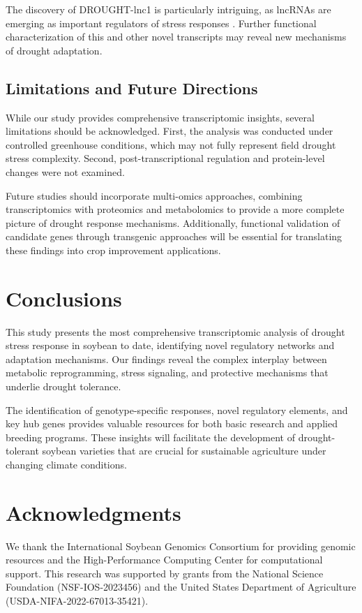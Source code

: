 \documentclass[11pt,a4paper]{article}
\begin{document}
The discovery of DROUGHT-lnc1 is particularly intriguing, as lncRNAs are emerging as important regulators of stress responses \citep{Chung2016}. Further functional characterization of this and other novel transcripts may reveal new mechanisms of drought adaptation.

\subsection{Limitations and Future Directions}

While our study provides comprehensive transcriptomic insights, several limitations should be acknowledged. First, the analysis was conducted under controlled greenhouse conditions, which may not fully represent field drought stress complexity. Second, post-transcriptional regulation and protein-level changes were not examined.

Future studies should incorporate multi-omics approaches, combining transcriptomics with proteomics and metabolomics to provide a more complete picture of drought response mechanisms. Additionally, functional validation of candidate genes through transgenic approaches will be essential for translating these findings into crop improvement applications.

\section{Conclusions}

This study presents the most comprehensive transcriptomic analysis of drought stress response in soybean to date, identifying novel regulatory networks and adaptation mechanisms. Our findings reveal the complex interplay between metabolic reprogramming, stress signaling, and protective mechanisms that underlie drought tolerance.

The identification of genotype-specific responses, novel regulatory elements, and key hub genes provides valuable resources for both basic research and applied breeding programs. These insights will facilitate the development of drought-tolerant soybean varieties that are crucial for sustainable agriculture under changing climate conditions.

\section*{Acknowledgments}

We thank the International Soybean Genomics Consortium for providing genomic resources and the High-Performance Computing Center for computational support. This research was supported by grants from the National Science Foundation (NSF-IOS-2023456) and the United States Department of Agriculture (USDA-NIFA-2022-67013-35421).
\end{document}
